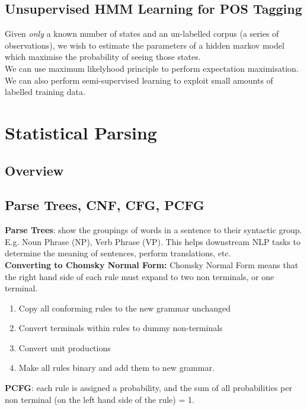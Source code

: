 \documentclass[]{article}
\begin{document}
	\subsection{Unsupervised HMM Learning for POS Tagging} 
	Given \textit{only} a known number of states and an un-labelled corpus (a series of observations), we wish to estimate the parameters of a hidden markov model which maximise the probability of seeing those states. 
	\\
	We can use maximum likelyhood principle to perform expectation maximisation.
	\\
	We can also perform semi-supervised learning to exploit small amounts of labelled training data.
	
	\clearpage
	\section{Statistical Parsing}
	
	\subsection{Overview}
	
	\subsection{Parse Trees, CNF, CFG, PCFG}
	
	\textbf{Parse Trees}: show the groupings of words in a sentence to their syntactic group. E.g. Noun Phrase (NP), Verb Phrase (VP). This helps downstream NLP tasks to determine the meaning of sentences, perform translations, etc. \\
	
	\textbf{Converting to Chomsky Normal Form:}
	Chomsky Normal Form means that the right hand side of each rule must expand to two non terminals, or one terminal. \cite{jurafsky2018speech}
	
	\begin{enumerate}
		\item Copy all conforming rules to the new grammar unchanged
		\item Convert terminals within rules to dummy non-terminals
		\item Convert unit productions
		\item Make all rules binary and add them to new grammar.
	\end{enumerate}
	

	\textbf{PCFG}: each rule is assigned a probability, and the sum of all probabilities per non terminal (on the left hand side of the rule) = 1.
\end{document}

